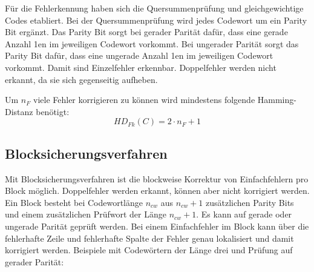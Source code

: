 \documentclass[11pt,a4paper]{scrreprt}
\begin{document}
Für die Fehlerkennung haben sich die Quersummenprüfung und gleichgewichtige Codes etabliert. Bei der Quersummenprüfung wird jedes Codewort um ein Parity Bit ergänzt. Das Parity Bit sorgt bei gerader Parität dafür, dass eine gerade Anzahl 1en im jeweiligen Codewort vorkommt. Bei ungerader Parität sorgt das Parity Bit dafür, dass eine ungerade Anzahl 1en im jeweiligen Codewort vorkommt. Damit sind Einzelfehler erkennbar. Doppelfehler werden nicht erkannt, da sie sich gegenseitig aufheben.

Um $n_F$ viele Fehler korrigieren zu können wird mindestens folgende Hamming-Distanz benötigt:
$$ HD_{Fk}(C) = 2 \cdot n_F + 1 $$

\subsection{Blocksicherungsverfahren}
Mit Blocksicherungsverfahren ist die blockweise Korrektur von Einfachfehlern pro Block möglich. Doppelfehler werden erkannt, können aber nicht korrigiert werden. Ein Block besteht bei Codewortlänge $n_{cw}$ aus $n_{cw} + 1$ zusätzlichen Parity Bits und einem zusätzlichen Prüfwort der Länge $n_{cw} + 1$. Es kann auf gerade oder ungerade Parität geprüft werden. Bei einem Einfachfehler im Block kann über die fehlerhafte Zeile und fehlerhafte Spalte der Fehler genau lokalisiert und damit korrigiert werden. Beispiele mit Codewörtern der Länge drei und Prüfung auf gerader Parität:
\end{document}
